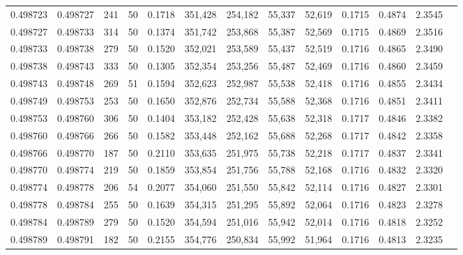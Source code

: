 \begin{tabular}{rrrrrrrrrrrrr}
0.498723 & 0.498727 & 241 &  50 &                                     0.1718 & 351,428 & 254,182 &  55,337 &  52,619 & 0.1715 & 0.4874 & 2.3545 \\
0.498727 & 0.498733 & 314 &  50 &                                     0.1374 & 351,742 & 253,868 &  55,387 &  52,569 & 0.1715 & 0.4869 & 2.3516 \\
0.498733 & 0.498738 & 279 &  50 &                                     0.1520 & 352,021 & 253,589 &  55,437 &  52,519 & 0.1716 & 0.4865 & 2.3490 \\
0.498738 & 0.498743 & 333 &  50 &                                     0.1305 & 352,354 & 253,256 &  55,487 &  52,469 & 0.1716 & 0.4860 & 2.3459 \\
0.498743 & 0.498748 & 269 &  51 &                                     0.1594 & 352,623 & 252,987 &  55,538 &  52,418 & 0.1716 & 0.4855 & 2.3434 \\
0.498749 & 0.498753 & 253 &  50 &                                     0.1650 & 352,876 & 252,734 &  55,588 &  52,368 & 0.1716 & 0.4851 & 2.3411 \\
0.498753 & 0.498760 & 306 &  50 &                                     0.1404 & 353,182 & 252,428 &  55,638 &  52,318 & 0.1717 & 0.4846 & 2.3382 \\
0.498760 & 0.498766 & 266 &  50 &                                     0.1582 & 353,448 & 252,162 &  55,688 &  52,268 & 0.1717 & 0.4842 & 2.3358 \\
0.498766 & 0.498770 & 187 &  50 &                                     0.2110 & 353,635 & 251,975 &  55,738 &  52,218 & 0.1717 & 0.4837 & 2.3341 \\
0.498770 & 0.498774 & 219 &  50 &                                     0.1859 & 353,854 & 251,756 &  55,788 &  52,168 & 0.1716 & 0.4832 & 2.3320 \\
0.498774 & 0.498778 & 206 &  54 &                                     0.2077 & 354,060 & 251,550 &  55,842 &  52,114 & 0.1716 & 0.4827 & 2.3301 \\
0.498778 & 0.498784 & 255 &  50 &                                     0.1639 & 354,315 & 251,295 &  55,892 &  52,064 & 0.1716 & 0.4823 & 2.3278 \\
0.498784 & 0.498789 & 279 &  50 &                                     0.1520 & 354,594 & 251,016 &  55,942 &  52,014 & 0.1716 & 0.4818 & 2.3252 \\
0.498789 & 0.498791 & 182 &  50 &                                     0.2155 & 354,776 & 250,834 &  55,992 &  51,964 & 0.1716 & 0.4813 & 2.3235 \\

\end{tabular}
